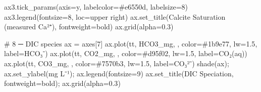 \documentclass[
  letterpaper,
  DIV=11,
  numbers=noendperiod]{scrartcl}
\newenvironment{Shaded}{\begin{snugshade}}{\end{snugshade}}
\newcommand{\CommentTok}[1]{\textcolor[rgb]{0.37,0.37,0.37}{#1}}
\newcommand{\DecValTok}[1]{\textcolor[rgb]{0.68,0.00,0.00}{#1}}
\newcommand{\FloatTok}[1]{\textcolor[rgb]{0.68,0.00,0.00}{#1}}
\newcommand{\NormalTok}[1]{\textcolor[rgb]{0.00,0.23,0.31}{#1}}
\newcommand{\OperatorTok}[1]{\textcolor[rgb]{0.37,0.37,0.37}{#1}}
\newcommand{\StringTok}[1]{\textcolor[rgb]{0.13,0.47,0.30}{#1}}
\begin{document}
\begin{Shaded}
\begin{Highlighting}[]
\NormalTok{ax3.tick\_params(axis}\OperatorTok{=}\StringTok{\textquotesingle{}y\textquotesingle{}}\NormalTok{, labelcolor}\OperatorTok{=}\StringTok{\textquotesingle{}\#e6550d\textquotesingle{}}\NormalTok{, labelsize}\OperatorTok{=}\DecValTok{8}\NormalTok{)}
\NormalTok{ax3.legend(fontsize}\OperatorTok{=}\DecValTok{8}\NormalTok{, loc}\OperatorTok{=}\StringTok{\textquotesingle{}upper right\textquotesingle{}}\NormalTok{)}
\NormalTok{ax.set\_title(}\StringTok{\textquotesingle{}Calcite Saturation (measured Ca²⁺)\textquotesingle{}}\NormalTok{, fontweight}\OperatorTok{=}\StringTok{\textquotesingle{}bold\textquotesingle{}}\NormalTok{)}
\NormalTok{ax.grid(alpha}\OperatorTok{=}\FloatTok{0.3}\NormalTok{)}

\CommentTok{\# 8 ─ DIC species}
\NormalTok{ax }\OperatorTok{=}\NormalTok{ axes[}\DecValTok{7}\NormalTok{]}
\NormalTok{ax.plot(tt, HCO3\_mg, }\StringTok{\textquotesingle{}{-}\textquotesingle{}}\NormalTok{, color}\OperatorTok{=}\StringTok{\textquotesingle{}\#1b9e77\textquotesingle{}}\NormalTok{, lw}\OperatorTok{=}\FloatTok{1.5}\NormalTok{, label}\OperatorTok{=}\StringTok{\textquotesingle{}HCO₃⁻\textquotesingle{}}\NormalTok{)}
\NormalTok{ax.plot(tt, CO2\_mg, }\StringTok{\textquotesingle{}{-}\textquotesingle{}}\NormalTok{, color}\OperatorTok{=}\StringTok{\textquotesingle{}\#d95f02\textquotesingle{}}\NormalTok{, lw}\OperatorTok{=}\FloatTok{1.5}\NormalTok{, label}\OperatorTok{=}\StringTok{\textquotesingle{}CO₂(aq)\textquotesingle{}}\NormalTok{)}
\NormalTok{ax.plot(tt, CO3\_mg, }\StringTok{\textquotesingle{}{-}\textquotesingle{}}\NormalTok{, color}\OperatorTok{=}\StringTok{\textquotesingle{}\#7570b3\textquotesingle{}}\NormalTok{, lw}\OperatorTok{=}\FloatTok{1.5}\NormalTok{, label}\OperatorTok{=}\StringTok{\textquotesingle{}CO₃²⁻\textquotesingle{}}\NormalTok{)}
\NormalTok{shade(ax)}\OperatorTok{;}\NormalTok{ ax.set\_ylabel(}\StringTok{\textquotesingle{}mg L⁻¹\textquotesingle{}}\NormalTok{)}\OperatorTok{;}\NormalTok{ ax.legend(fontsize}\OperatorTok{=}\DecValTok{9}\NormalTok{)}
\NormalTok{ax.set\_title(}\StringTok{\textquotesingle{}DIC Speciation\textquotesingle{}}\NormalTok{, fontweight}\OperatorTok{=}\StringTok{\textquotesingle{}bold\textquotesingle{}}\NormalTok{)}\OperatorTok{;}\NormalTok{ ax.grid(alpha}\OperatorTok{=}\FloatTok{0.3}\NormalTok{)}


\end{Highlighting}
\end{Shaded}
\end{document}

